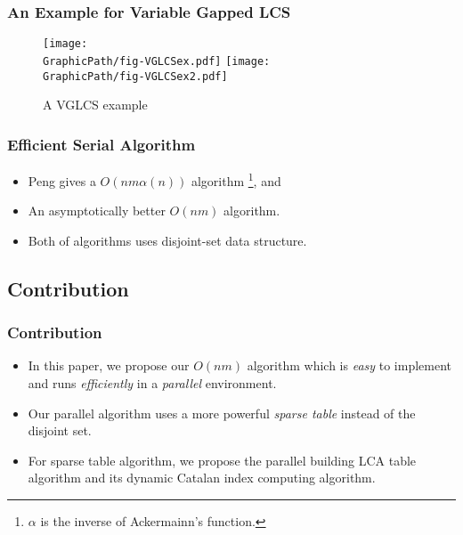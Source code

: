 \begin{frame}
    \frametitle{An Example for Variable Gapped LCS}
    \begin{figure}[!thb]
      \centering
      \texttt{[image: \\GraphicPath/fig-VGLCSex.pdf]}
      \texttt{[image: \\GraphicPath/fig-VGLCSex2.pdf]}
      \caption{A VGLCS example} \label{fig:VGLCSex}
    \end{figure}
\end{frame}

\begin{frame}
    \frametitle{Efficient Serial Algorithm}
    \begin{itemize}
        \setlength\itemsep{1em}
        \item 
            Peng gives a $O(n m \alpha(n))$ algorithm \footnote{$\alpha$
            is the inverse of Ackermainn's function.}, and
        \item
            An asymptotically better $O(n m)$ algorithm.
        \item 
            Both of algorithms uses disjoint-set data structure.
    \end{itemize}
\end{frame}

\subsection{Contribution}
\begin{frame}
    \frametitle{Contribution}
    \begin{itemize}
        \setlength\itemsep{1em}
        \item
            In this paper, we propose our $O(nm)$ algorithm which is {\em
            easy} to implement and runs {\em efficiently} in a {\em
            parallel} environment.
        \item
            Our parallel algorithm uses a more powerful {\em sparse table}
            instead of the disjoint set.
        \item
            For sparse table algorithm, we propose the parallel building
            LCA table algorithm and its dynamic Catalan index computing
            algorithm.
    \end{itemize}
\end{frame}
